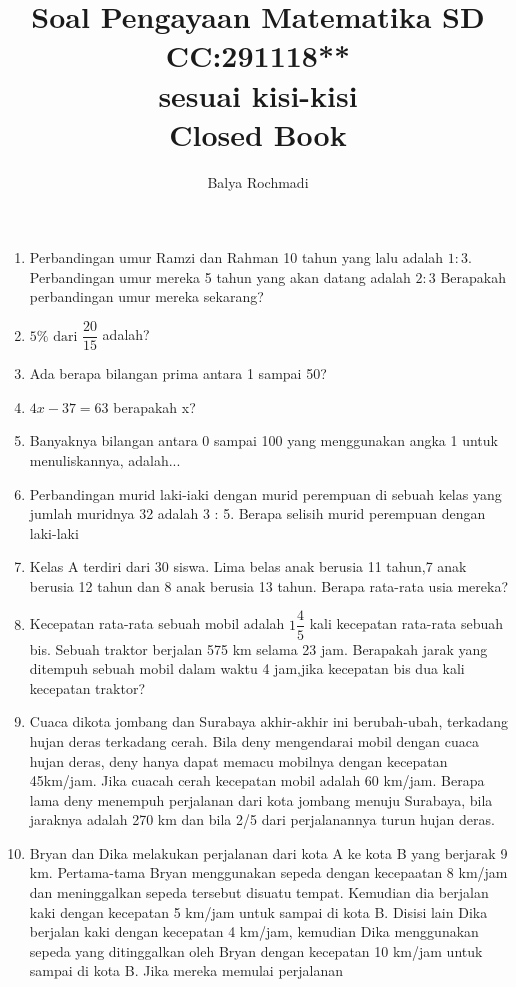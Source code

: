\documentclass[12pt,a4paper,draft,final,oneside,twoside,openright,openany]{article}
\author{Balya Rochmadi}
\title{Soal Pengayaan Matematika SD \\CC:291118**\\ sesuai kisi-kisi \\
	Closed Book}
\begin{document}
	\maketitle
	\Large
		\noindent\makebox[\linewidth]{\rule{\paperwidth}{0.4pt}}
	\begin{enumerate}
		\item Perbandingan umur Ramzi dan Rahman 10 tahun yang lalu adalah $1:3$. Perbandingan umur mereka 5 tahun yang akan  datang adalah $2:3$ Berapakah perbandingan umur mereka sekarang?
		\item $5\% \text{ dari } \dfrac{20}{15}$ adalah?
		\item Ada berapa bilangan prima antara 1 sampai 50?
		\item $4x-37=63$ berapakah x?
		\item Banyaknya bilangan antara 0 sampai 100 yang menggunakan angka 1 untuk menuliskannya, adalah...
		\item Perbandingan murid laki-iaki dengan murid perempuan di sebuah kelas yang jumlah muridnya 32 adalah 3 : 5. Berapa selisih murid perempuan dengan laki-laki
		\item Kelas A terdiri dari 30 siswa. Lima belas anak berusia 11 tahun,7 anak berusia 12 tahun dan 8 anak berusia 13 tahun. Berapa rata-rata usia mereka?
		\item Kecepatan rata-rata sebuah mobil adalah $1\dfrac{4}{5}$
		kali kecepatan rata-rata sebuah bis. Sebuah traktor berjalan 575 km selama 23 jam. Berapakah jarak yang ditempuh sebuah mobil
		dalam waktu 4 jam,jika kecepatan bis dua kali kecepatan traktor?
		\item Cuaca dikota jombang dan Surabaya akhir-akhir ini berubah-ubah, terkadang hujan deras
		terkadang cerah. Bila deny mengendarai mobil dengan cuaca hujan deras, deny hanya
		dapat memacu mobilnya dengan kecepatan 45km/jam. Jika cuacah cerah kecepatan mobil
		adalah 60 km/jam. Berapa lama deny menempuh perjalanan dari kota jombang menuju
		Surabaya, bila jaraknya adalah 270 km dan bila 2/5 dari perjalanannya turun hujan deras.
		\item Bryan dan Dika melakukan perjalanan dari kota A ke kota B yang berjarak 9 km.
		Pertama-tama Bryan menggunakan sepeda dengan kecepaatan 8 km/jam dan
		meninggalkan sepeda tersebut disuatu tempat. Kemudian dia berjalan kaki dengan
		kecepatan 5 km/jam untuk sampai di kota B. Disisi lain Dika berjalan kaki dengan
		kecepatan 4 km/jam, kemudian Dika menggunakan sepeda yang ditinggalkan oleh Bryan
		dengan kecepatan 10 km/jam untuk sampai di kota B. Jika mereka memulai perjalanan

\end{enumerate}
\end{document}
